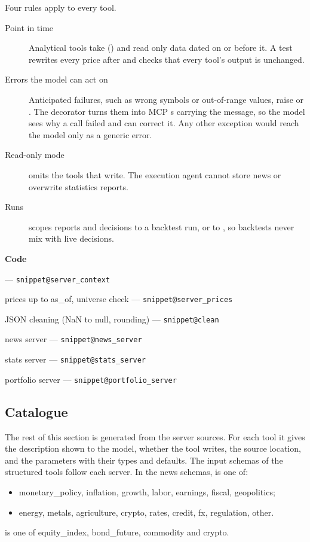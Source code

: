 \documentclass[11pt,a4paper]{article}
\makeatletter
\newcommand{\snippetsource}[1]{\csname snippet@#1\endcsname}
\newcommand{\snippet}[3]{%
  }
\newenvironment{codepointers}{%
  \par\smallskip\begingroup\footnotesize\noindent\textcolor{blue!50!black}{\textbf{Code}}\par\nopagebreak
  \begin{list}{}{\setlength{\leftmargin}{1.2em}\setlength{\itemsep}{0pt}\setlength{\parsep}{0pt}\setlength{\topsep}{1pt}}}%
  {\end{list}\endgroup\smallskip}
\newcommand{\codeitem}[2]{\item #2 --- \texttt{\snippetsource{#1}}}
\makeatother
\begin{document}
Four rules apply to every tool.
\begin{description}
  \item[Point in time] Analytical tools take  () and read only
        data dated on or before it. A test rewrites every price after  and
        checks that every tool's output is unchanged.
  \item[Errors the model can act on] Anticipated failures, such as wrong symbols or
        out-of-range values, raise  or . The decorator turns
        them into MCP s carrying the message, so the model sees why a call
        failed and can correct it. Any other exception would reach the model only as a
        generic error.
  \item[Read-only mode]  omits the tools that write. The execution agent
        cannot store news or overwrite statistics reports.
  \item[Runs]  scopes reports and decisions to a backtest run, or to
        , so backtests never mix with live decisions.
\end{description}
\snippet{tool_decorator}{Python}{Tool registration}
\snippet{parse_as_of}{Python}{The as-of date}
\begin{codepointers}
  \codeitem{server_context}{}
  \codeitem{server_prices}{prices up to as\_of, universe check}
  \codeitem{clean}{JSON cleaning (NaN to null, rounding)}
  \codeitem{news_server}{news server}
  \codeitem{stats_server}{stats server}
  \codeitem{portfolio_server}{portfolio server}
\end{codepointers}

\subsection{Catalogue}
The rest of this section is generated from the server sources. For each tool it gives the
description shown to the model, whether the tool writes, the source location, and the
parameters with their types and defaults. The input schemas of the structured tools follow
each server. In the news schemas,  is one of:
\begin{itemize}
  \item monetary\_policy, inflation, growth, labor, earnings, fiscal, geopolitics;
  \item energy, metals, agriculture, crypto, rates, credit, fx, regulation, other.
\end{itemize}
 is one of equity\_index, bond\_future, commodity and crypto.
\end{document}
